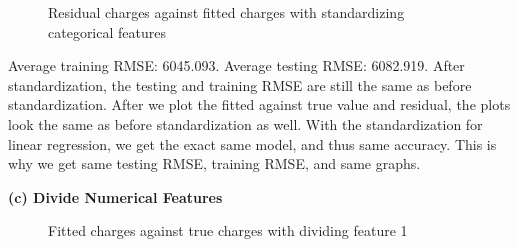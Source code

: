 \documentclass{article}
\begin{document}
\begin{figure}[!htbp]
\centering
{}
\caption{Residual charges against fitted charges with standardizing categorical features} \label{3_1_b_2}
\end{figure}

Average training RMSE: 6045.093.\newline
\indent Average testing RMSE: 6082.919.\newline
\indent After standardization, the testing and training RMSE are still the same as before standardization. After we plot the fitted against true value and residual, the plots look the same as before standardization as well. With the standardization for linear regression, we get the exact same model, and thus same accuracy. This is why we get same testing RMSE, training RMSE, and same graphs.\bigbreak

\noindent \textbf{(c) Divide Numerical Features} \bigbreak

\begin{figure}[!htbp]
\centering
{}
\caption{Fitted charges against true charges with dividing feature 1} \label{3_1_c_1}
\end{figure}
\end{document}
